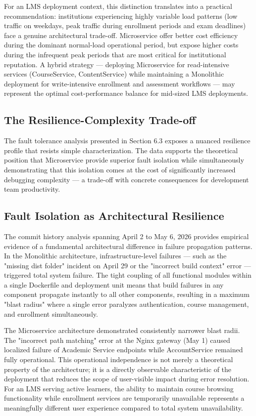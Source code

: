 For an LMS deployment context, this distinction translates into a practical recommendation: institutions experiencing highly variable load patterns (low traffic on weekdays, peak traffic during enrollment periods and exam deadlines) face a genuine architectural trade-off. Microservice offer better cost efficiency during the dominant normal-load operational period, but expose higher costs during the infrequent peak periods that are most critical for institutional reputation. A hybrid strategy — deploying Microservice for read-intensive services (CourseService, ContentService) while maintaining a Monolithic deployment for write-intensive enrollment and assessment workflows — may represent the optimal cost-performance balance for mid-sized LMS deployments.

\subsection{The Resilience-Complexity Trade-off}

The fault tolerance analysis presented in Section 6.3 exposes a nuanced resilience profile that resists simple characterization. The data supports the theoretical position that Microservice provide superior fault isolation while simultaneously demonstrating that this isolation comes at the cost of significantly increased debugging complexity — a trade-off with concrete consequences for development team productivity.

\subsection{Fault Isolation as Architectural Resilience}

The commit history analysis spanning April 2 to May 6, 2026 provides empirical evidence of a fundamental architectural difference in failure propagation patterns. In the Monolithic architecture, infrastructure-level failures — such as the "missing dist folder" incident on April 29 or the "incorrect build context" error — triggered total system failure. The tight coupling of all functional modules within a single Dockerfile and deployment unit means that build failures in any component propagate instantly to all other components, resulting in a maximum "blast radius" where a single error paralyzes authentication, course management, and enrollment simultaneously.

The Microservice architecture demonstrated consistently narrower blast radii. The "incorrect path matching" error at the Nginx gateway (May 1) caused localized failure of Academic Service endpoints while AccountService remained fully operational. This operational independence is not merely a theoretical property of the architecture; it is a directly observable characteristic of the deployment that reduces the scope of user-visible impact during error resolution. For an LMS serving active learners, the ability to maintain course browsing functionality while enrollment services are temporarily unavailable represents a meaningfully different user experience compared to total system unavailability.

